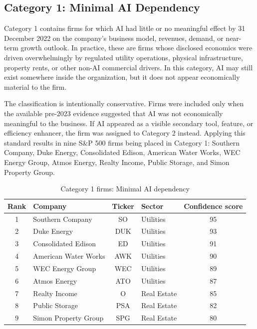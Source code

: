 \documentclass{article}
\begin{document}
\subsection{Category 1: Minimal AI Dependency}

Category 1 contains firms for which AI had little or no meaningful effect by 31 December 2022 on the company’s business model, revenues, demand, or near-term growth outlook. In practice, these are firms whose disclosed economics were driven overwhelmingly by regulated utility operations, physical infrastructure, property rents, or other non-AI commercial drivers. In this category, AI may still exist somewhere inside the organization, but it does not appear economically material to the firm.

The classification is intentionally conservative. Firms were included only when the available pre-2023 evidence suggested that AI was not economically meaningful to the business. If AI appeared as a visible secondary tool, feature, or efficiency enhancer, the firm was assigned to Category 2 instead. Applying this standard results in nine S\&P 500 firms being placed in Category 1: Southern Company, Duke Energy, Consolidated Edison, American Water Works, WEC Energy Group, Atmos Energy, Realty Income, Public Storage, and Simon Property Group.

\begin{table}[H]
\centering
\caption{Category 1 firms: Minimal AI dependency}
\begin{tabular}{|c|l|c|l|c|}
\hline
\textbf{Rank} & \textbf{Company} & \textbf{Ticker} & \textbf{Sector} & \textbf{Confidence score} \\ \hline
1 & Southern Company & SO & Utilities & 95 \\ \hline
2 & Duke Energy & DUK & Utilities & 93 \\ \hline
3 & Consolidated Edison & ED & Utilities & 91 \\ \hline
4 & American Water Works & AWK & Utilities & 90 \\ \hline
5 & WEC Energy Group & WEC & Utilities & 89 \\ \hline
6 & Atmos Energy & ATO & Utilities & 87 \\ \hline
7 & Realty Income & O & Real Estate & 85 \\ \hline
8 & Public Storage & PSA & Real Estate & 82 \\ \hline
9 & Simon Property Group & SPG & Real Estate & 80 \\ \hline
\end{tabular}
\label{tab:category1}
\end{table}
\end{document}
